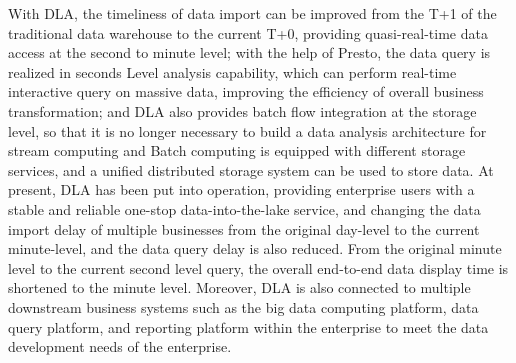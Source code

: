 \begin{abstract*}
With DLA, the timeliness of data import can be improved from the T+1 of the traditional
data warehouse to the current T+0, providing quasi-real-time data access at the second to
minute level; with the help of Presto, the data query is realized in seconds Level analysis
capability, which can perform real-time interactive query on massive data, improving the
efficiency of overall business transformation; and DLA also provides batch flow integration
at the storage level, so that it is no longer necessary to build a data analysis architecture
for stream computing and Batch computing is equipped with different storage services, and a
unified distributed storage system can be used to store data. At present, DLA has been put
into operation, providing enterprise users with a stable and reliable one-stop data-into-the-lake
service, and changing the data import delay of multiple businesses from the original day-level
to the current minute-level, and the data query delay is also reduced. From the original minute
level to the current second level query, the overall end-to-end data display time is shortened
to the minute level. Moreover, DLA is also connected to multiple downstream business systems
such as the big data computing platform, data query platform, and reporting platform within the
enterprise to meet the data development needs of the enterprise.

\end{abstract*}
